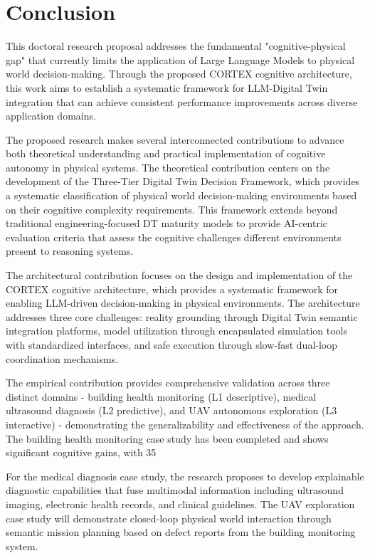 
\chapter{Conclusion} \label{chp:conclusion}

This doctoral research proposal addresses the fundamental "cognitive-physical gap" that currently limits the application of Large Language Models to physical world decision-making. Through the proposed CORTEX cognitive architecture, this work aims to establish a systematic framework for LLM-Digital Twin integration that can achieve consistent performance improvements across diverse application domains.

The proposed research makes several interconnected contributions to advance both theoretical understanding and practical implementation of cognitive autonomy in physical systems. The theoretical contribution centers on the development of the Three-Tier Digital Twin Decision Framework, which provides a systematic classification of physical world decision-making environments based on their cognitive complexity requirements. This framework extends beyond traditional engineering-focused DT maturity models to provide AI-centric evaluation criteria that assess the cognitive challenges different environments present to reasoning systems.

The architectural contribution focuses on the design and implementation of the CORTEX cognitive architecture, which provides a systematic framework for enabling LLM-driven decision-making in physical environments. The architecture addresses three core challenges: reality grounding through Digital Twin semantic integration platforms, model utilization through encapsulated simulation tools with standardized interfaces, and safe execution through slow-fast dual-loop coordination mechanisms.

The empirical contribution provides comprehensive validation across three distinct domains - building health monitoring (L1 descriptive), medical ultrasound diagnosis (L2 predictive), and UAV autonomous exploration (L3 interactive) - demonstrating the generalizability and effectiveness of the approach. The building health monitoring case study has been completed and shows significant cognitive gains, with 35%

For the medical diagnosis case study, the research proposes to develop explainable diagnostic capabilities that fuse multimodal information including ultrasound imaging, electronic health records, and clinical guidelines. The UAV exploration case study will demonstrate closed-loop physical world interaction through semantic mission planning based on defect reports from the building monitoring system.

